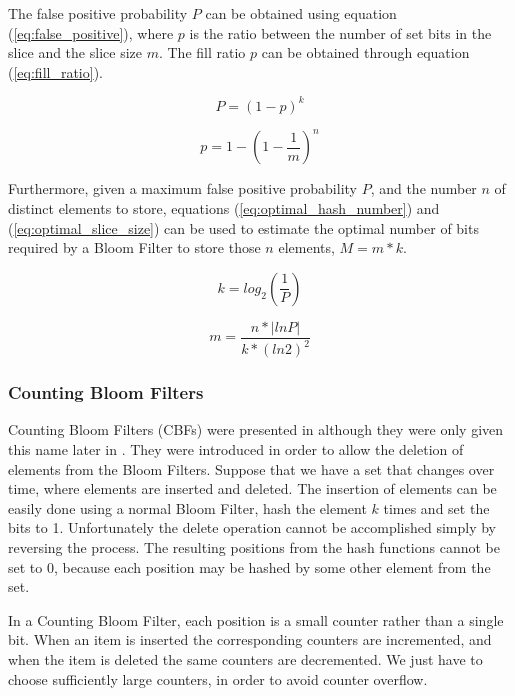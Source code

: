 The false positive probability $P$
can be obtained using equation (\ref{eq:false_positive}), where $p$ is
the ratio between the number of set bits in the slice and the slice
size $m$. The fill ratio $p$ can be obtained through equation
(\ref{eq:fill_ratio}).

\begin{equation}
  \label{eq:false_positive}
  P = (1-p)^k
\end{equation}

\begin{equation}
  \label{eq:fill_ratio}
  p = 1-\left(1-\frac{1}{m}\right)^n
\end{equation}

Furthermore, given a maximum false positive probability $P$, and the
number $n$ of distinct elements to store, equations
(\ref{eq:optimal_hash_number}) and (\ref{eq:optimal_slice_size}) can
be used to estimate the optimal number of bits required by a Bloom
Filter to store those $n$ elements, $M=m*k$.

\begin{equation}
  \label{eq:optimal_hash_number}
  k = log_2\left(\frac{1}{P}\right)
\end{equation}

\begin{equation}
  \label{eq:optimal_slice_size}
  m = \frac{n*|lnP|}{k*(ln2)^2}
\end{equation}

\subsubsection{Counting Bloom Filters}
\label{sec:count-bloom-filt}

Counting Bloom Filters (CBFs) were presented in
\cite{Fan98summarycache:} although they were only given this name
later in \cite{Mitzenmacher:2002:CBF:581876.581878}. They were
introduced in order to allow the deletion of elements from the Bloom
Filters. Suppose that we have a set that changes over time, where
elements are inserted and deleted. The insertion of elements can be
easily done using a normal Bloom Filter, hash the element $k$ times
and set the bits to 1. Unfortunately the delete operation cannot be
accomplished simply by reversing the process. The resulting positions
from the hash functions cannot be set to 0, because each position may
be hashed by some other element from the set.

In a Counting Bloom Filter, each position is a small counter rather
than a single bit. When an item is inserted the corresponding counters
are incremented, and when the item is deleted the same counters are
decremented. We just have to choose sufficiently large counters, in
order to avoid counter overflow.

